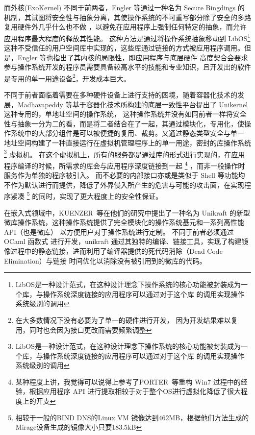     而外核(ExoKernel) 不同于前两者，Engler 等通过一种名为 Secure Bingdings 的机制，其试图将安全性与抽象分离，其使操作系统的不可重写部分除了安全的多路复用硬件外几乎什么也不做
    ，以避免在应用程序上强制任何特定的抽象，而允许应用程序最大程度的释放其性能。
    这种方法是通过将操作系统抽象移动到 LibOS\footnote{LibOS是一种设计范式，在这种设计理念下操作系统的核心功能被封装成为一个库，与操作系统深度链接的应用程序可以通过对于这个库
    的调用实现操作系统级别的调用}
     这种不受信任的用户空间库中实现的，这些库通过链接的方式被应用程序调用。但是，Engler 等也指出了其内核的局限性，即应用程序与底层硬件
    高度契合会要求参与操作系统开发的程序员需要具备较高水平的技能和专业知识，且开发出的软件是专用的单一用途设备\footnote{在大多数情况下没有必要为了单一的硬件进行开发，
    因为开发结果难以复用，同时也会因为接口更改而需要频繁调整}，开发成本巨大。
    \cite{wikiosdev_exokernel, engler_exokernel_1998}

    不同于前者面临着需要在多种硬件设备上进行支持的困境，随着容器化技术的发展，Madhavapeddy 等基于容器化技术所构建的底层一致性平台提出了 Unikernel 这种专用的，单地址空间的操作系统，
    这种操作系统并没有如同前者一样将安全性与抽象一分为二的看，而是将二者结合在了一起，其通过模块化，专用化，使操作系统中的大部分组件是可以被便捷的复用、裁剪。又通过静态类型安全与单一
    地址空间构建了一种直接运行在虚拟机管理程序上的单一用途，密封的库操作系统\footnote{LibOS是一种设计范式，在这种设计理念下操作系统的核心功能被封装成为一个库，与操作系统深度链接的应用程序可以通过对于这个库
    的调用实现操作系统级别的调用} 虚拟机。
    在这个虚拟机上，所有的服务都是通过库的形式进行实现的，在应用程序编译的时候，所需求的库会与应用程序深度链接到一起
    \footnote{某种程度上讲，我觉得可以说得上参考了PORTER 等重构 Win7 过程中的经验，根据应用程序 API 进行提取相较于对于整个OS进行虚拟化降低了很大程度上的开支\cite{porter_rethinking_nodate}}
    ，而非一般操作时服务作为单独的程序被引入。
    而不必要的内部接口亦或是类似于 Shell 等功能均不作为默认进行而提供，降低了外界侵入所产生的危害与可能的攻击面，在实现程序紧凑
    \footnote{相较于一般的BIND DNS的Linux VM 镜像达到462MB，根据他们方法生成的Mirage设备生成的镜像大小只要183.5kB}
    的同时，实现了更大程度上的安全性保证。\cite{madhavapeddy_unikernels_nodate}

    在嵌入式领域中，KUENZER 等在他们的研究中提出了一种名为 Unikraft 的新型微库操作系统，这种操作系统提供了完全模块化的操作系统基元和一系列高性能 API（也是微库） 以方便用户对于操作系统进行定制。
    不同于前者必须通过 OCaml 函数式 进行开发，unikraft 通过其独特的编译、链接工具，实现了构建镜像过程中的静态链接，进而利用了编译器提供的死代码消除（Dead Code Elimination）与链接
    时间优化以消除没有被引用到的微库的代码。
    \cite{kuenzer_unikraft_2021}

